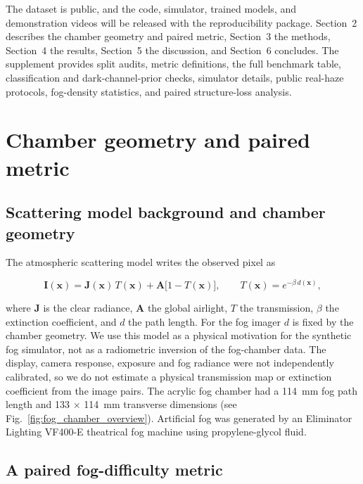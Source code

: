 \documentclass{optica-article}
\begin{document}
 
The dataset is public, and the code, simulator, trained models, and
demonstration videos will be released with the reproducibility
package. Section~2 describes the chamber geometry and paired metric,
Section~3 the methods, Section~4 the results, Section~5 the
discussion, and Section~6 concludes. The supplement provides split audits, metric definitions, the full benchmark table, classification and dark-channel-prior checks, simulator details, public real-haze protocols, fog-density statistics, and paired structure-loss analysis.

\section{Chamber geometry and paired metric}
\label{sec:fogphysics}
 
\subsection{Scattering model background and chamber geometry}
 
The atmospheric scattering model \cite{narasimhan2002vision} writes
the observed pixel as
 
\begin{equation}
  \mathbf{I}(\mathbf{x}) =
    \mathbf{J}(\mathbf{x})\,T(\mathbf{x})
    + \mathbf{A}\bigl[1 - T(\mathbf{x})\bigr],
  \qquad
  T(\mathbf{x}) = e^{-\beta\, d(\mathbf{x})},
  \label{eq:scattering}
\end{equation}
 
\noindent where $\mathbf{J}$ is the clear radiance, $\mathbf{A}$ the
global airlight, $T$ the transmission, $\beta$ the extinction
coefficient, and $d$ the path length. For the fog imager $d$ is
fixed by the chamber geometry. We use this model as a physical motivation for the synthetic fog simulator, not as a radiometric inversion of the fog-chamber data. The display, camera response, exposure and fog radiance were not independently calibrated, so we do not estimate a physical transmission map or extinction coefficient from the image pairs. The acrylic fog chamber had a 114~mm fog path length and 133 $\times$ 114~mm transverse dimensions (see Fig.~\ref{fig:fog_chamber_overview}). Artificial
fog was generated by an Eliminator Lighting VF400-E theatrical fog
machine using propylene-glycol fluid.
 
\subsection{A paired fog-difficulty metric}
\label{subsec:fogdifficulty}
 
\end{document}
